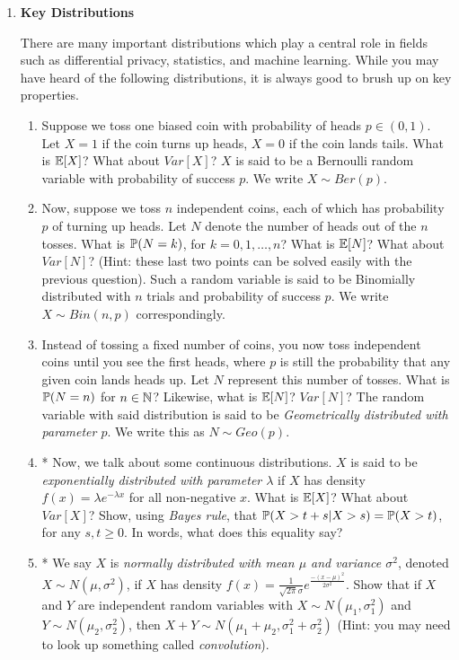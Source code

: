 \begin{enumerate}[leftmargin=\parindent, itemsep=3ex]
    \item{\bf Key Distributions}

    There are many important distributions which play a central role in fields such as differential privacy, statistics, and machine learning. While you may have heard of the following distributions, it is always good to brush up on key properties.

    \begin{enumerate}
        \item Suppose we toss one biased coin with probability of heads $p \in (0, 1)$. Let $X = 1$ if the coin turns up heads, $X = 0$ if the coin lands tails. What is $\E[X]$? What about $Var[X]$? $X$ is said to be a Bernoulli random variable with probability of success $p$. We write $X \sim Ber(p)$.
        \item Now, suppose we toss $n$ independent coins, each of which has probability $p$ of turning up heads. Let $N$ denote the number of heads out of the $n$ tosses. What is $\P(N = k)$, for $k = 0, 1, \dots, n$? What is $\E[N]$? What about $Var[N]$? (Hint: these last two points can be solved easily with the previous question). Such a random variable is said to be Binomially distributed with $n$ trials and probability of success $p$. We write $X \sim Bin(n, p)$ correspondingly.
        \item Instead of tossing a fixed number of coins, you now toss independent coins until you see the first heads, where $p$ is still the probability that any given coin lands heads up. Let $N$ represent this number of tosses. What is $\P(N = n)$ for $n \in \N$? Likewise, what is $\E[N]$? $Var[N]$? The random variable with said distribution is said to be \textit{Geometrically distributed with parameter $p$}. We write this as $N \sim Geo(p)$.
        \item * Now, we talk about some continuous distributions. $X$ is said to be \textit{exponentially distributed with parameter $\lambda$} if $X$ has density $f(x) = \lambda e^{-\lambda x}$ for all non-negative $x$. What is $\E[X]$? What about $Var[X]$? Show, using \textit{Bayes rule}, that $\P(X > t + s| X > s) = \P(X > t)$, for any $s, t \geq 0$. In words, what does this equality say?
        \item * We say $X$ is \textit{normally distributed with mean $\mu$ and variance $\sigma^2$}, denoted $X \sim N(\mu, \sigma^2)$, if $X$ has density $f(x) = \frac{1}{\sqrt{2\pi}\sigma}e^{\frac{-(x - \mu)^2}{2\sigma^2}}$. Show that if $X$ and $Y$ are independent random variables with $X \sim N(\mu_1, \sigma_1^2)$ and $Y \sim N(\mu_2, \sigma_2^2)$, then $X + Y \sim N(\mu_1 + \mu_2, \sigma_1^2 + \sigma_2^2)$ (Hint: you may need to look up something called \textit{convolution}).
    \end{enumerate}



\end{enumerate}
